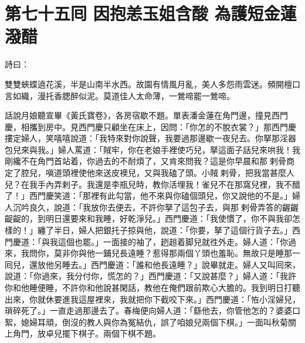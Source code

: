 
\chapter*{第七十五囘 因抱恙玉姐含酸 為護短金蓮潑醋}


詩曰：

雙雙蛺蝶遶花溪，半是山南半水西。故園有情風月亂，美人多怨雨雲迷。頻開檀口言如織，漫托香腮醉似泥。莫道佳人太命薄，一鶯啼罷一鶯啼。

話說月娘聽宣畢《黃氏寶卷》，各房宿歇不題。單表潘金蓮在角門邊，撞見西門慶，相攜到房中。見西門慶只顧坐在床上，{}因問：「你怎的不脫衣裳？」那西門慶摟定婦人，笑嘻嘻說道：「我特來對你說聲，我要過那邊歇一夜兒去。你拏那淫器包兒來與我。」婦人罵道：「賊牢，你在老娘手裡使巧兒，拏這面子話兒來哄我！{}我剛纔不在角門首站着，你過去的不耐煩了，又肯來問我？這是你早晨和那𢱉剌骨商定了腔兒，嗔道頭裡使他來送皮襖兒，又與我磕了頭。小賊𢱉剌骨，把我當甚麼人兒？在我手內弄剌子。我還是李瓶兒時，教你活埋我！{}雀兒不在那窩兒裡，我不醋了！」{}西門慶笑道：「那裡有此勾當，他不來與你磕個頭兒，你又說他的不是。」婦人沉吟良久，說道：「我放你去便去，{}不許你拏了這包子去，{}與那𢱉剌骨弄答的齷齷齪齪的，到明日還要來和我睡，好乾淨兒。」{}西門慶道：「我使慣了，你不與我卻怎樣的！」纏了半日，婦人把銀托子掠與他，說道：「你要，拏了這個行貨子去。」西門慶道：「與我這個也罷。」一面接的袖了，趔趄着脚兒就徃外走。婦人道：「你過來，我問你，莫非你與他一鋪兒長遠睡？惹得那兩個丫頭也羞恥。無故只是睡那一囘兒，還放他另睡去。」西門慶道：「誰和他長遠睡？」說畢就走。婦人又叫囘來，說道：「你過來，我分付你，慌怎的？」{}西門慶道：「又說甚麼？」婦人道：「我許你和他睡便睡，不許你和他說甚閑話，教他在俺們跟前欺心大膽的。我到明日打聽出來，你就休要進我這屋裡來，我就把你下截咬下來。」{}西門慶道：「恠小淫婦兒，瑣碎死了。」一直走過那邊去了。春梅便向婦人道：「繇他去，你管他怎的？婆婆口絮，媳婦耳頑，倒沒的教人與你為冤結仇，{}誤了咱娘兒兩個下棋。」一面叫秋菊關上角門，放卓兒擺下棋子。兩個下棋不題。

